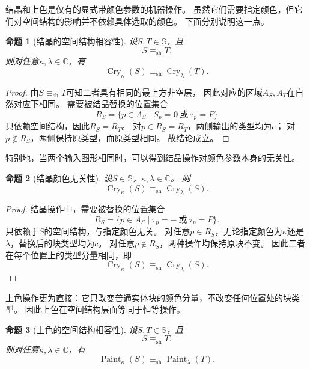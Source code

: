 \documentclass[UTF8,fontset=none]{ctexart}
\theoremstyle{cnthm}
\newtheorem{proposition}{命题}[section]
\begin{document}
			结晶和上色是仅有的显式带颜色参数的机器操作。
			虽然它们需要指定颜色，但它们对空间结构的影响并不依赖具体选取的颜色。
			下面分别说明这一点。
			
			\begin{proposition}[结晶的空间结构相容性]\label{prop:cry-shape-compatibility}
				设$S,T\in\mathbb{S}$，且
				$$
				S\equiv_{\mathrm{sh}}T.
				$$
				则对任意$\kappa,\lambda\in\mathbb{C}$，有
				$$
				\operatorname{Cry}_{\kappa}(S)
				\equiv_{\mathrm{sh}}
				\operatorname{Cry}_{\lambda}(T).
				$$
			\end{proposition}
			
			\begin{proof}
				由$S\equiv_{\mathrm{sh}}T$可知二者具有相同的最上方非空层，
				因此对应的区域$A_S,A_T$在自然对应下相同。
				需要被结晶替换的位置集合
				$$
				R_S=\{p\in A_S\mid S_p=\mathbf{0}\ \text{或}\ \tau_p=P\}
				$$
				只依赖空间结构，因此$R_S=R_T$。
				对$p\in R_S=R_T$，两侧输出的类型均为$c$；
				对$p\notin R_S$，两侧保持原类型，而原类型相同。
				故结论成立。
			\end{proof}
			
			特别地，当两个输入图形相同时，可以得到结晶操作对颜色参数本身的无关性。
			
			\begin{proposition}[结晶颜色无关性]\label{prop:cry-color-independence}
				设$S\in\mathbb{S}$，$\kappa,\lambda\in\mathbb{C}$。
				则
				$$
				\operatorname{Cry}_{\kappa}(S)
				\equiv_{\mathrm{sh}}
				\operatorname{Cry}_{\lambda}(S).
				$$
			\end{proposition}
			
			\begin{proof}
				结晶操作中，需要被替换的位置集合
				$$
				R_S=\{p\in A_S\mid \tau_p=-\ \text{或}\ \tau_p=P\}.
				$$
				只依赖于$S$的空间结构，与指定颜色无关。
				对任意$p\in R_S$，无论指定颜色为$\kappa$还是$\lambda$，替换后的块类型均为$c$。
				对任意$p\notin R_S$，两种操作均保持原块不变。
				因此二者在每个位置上的类型分量相同，即
				$$
				\operatorname{Cry}_{\kappa}(S)
				\equiv_{\mathrm{sh}}
				\operatorname{Cry}_{\lambda}(S).
				$$
			\end{proof}
			
			上色操作更为直接：它只改变普通实体块的颜色分量，不改变任何位置处的块类型。
			因此上色在空间结构层面等同于恒等操作。
			
			\begin{proposition}[上色的空间结构相容性]\label{prop:paint-shape-compatibility}
				设$S,T\in\mathbb{S}$，且
				$$
				S\equiv_{\mathrm{sh}}T.
				$$
				则对任意$\kappa,\lambda\in\mathbb{C}$，有
				$$
				\operatorname{Paint}_{\kappa}(S)
				\equiv_{\mathrm{sh}}
				\operatorname{Paint}_{\lambda}(T).
				$$
			\end{proposition}
			
\end{document}
